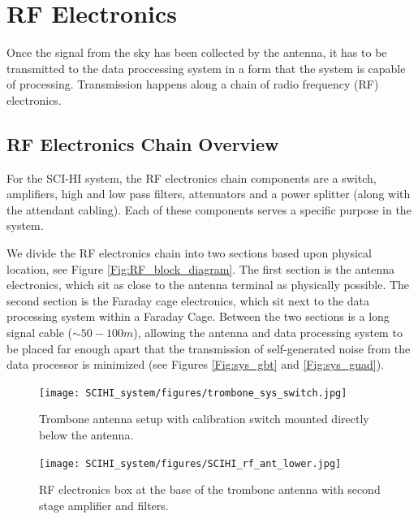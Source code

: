 \section{RF Electronics}

Once the signal from the sky has been collected by the antenna, it has to be transmitted to the data proccessing system in a form that the system is capable of processing. Transmission happens along a chain of radio frequency (RF) electronics. 


\subsection{RF Electronics Chain Overview}

For the SCI-HI system, the RF electronics chain components are a switch, amplifiers, high and low pass filters, attenuators and a power splitter (along with the attendant cabling). Each of these components serves a specific purpose in the system. 

We divide the RF electronics chain into two sections based upon physical location, see Figure \ref{Fig:RF_block_diagram}. The first section is the antenna electronics, which sit as close to the antenna terminal as physically possible. The second section is the Faraday cage electronics, which sit next to the data processing system within a Faraday Cage. Between the two sections is a long signal cable ($\sim50-100 m$), allowing the antenna and data processing system to be placed far enough apart that the transmission of self-generated noise from the data processor is minimized (see Figures \ref{Fig:sys_gbt} and \ref{Fig:sys_guad}).

\begin{figure}[htb]
\centering
\begin{minipage}[b]{0.47\textwidth}
\centering
\texttt{[image: SCIHI\_system/figures/trombone\_sys\_switch.jpg]}
\caption{Trombone antenna setup with calibration switch mounted directly below the antenna.}
\label{Fig:trombone_switch}
\end{minipage}%
\begin{minipage}[b]{0.02\textwidth}
\hspace{1cm}
\end{minipage}%
\begin{minipage}[b]{0.47\textwidth}
\centering
\texttt{[image: SCIHI\_system/figures/SCIHI\_rf\_ant\_lower.jpg]}
\caption{RF electronics box at the base of the trombone antenna with second stage amplifier and filters.}
\label{Fig:trombone_base}
\end{minipage}
\end{figure}

